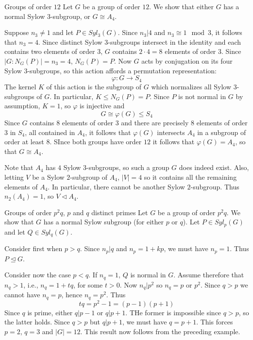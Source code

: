 \documentclass[12pt, a4paper, twoside, openright, titlepage]{book}
\begin{document}
\begin{eg}{Groups of order $12$}{}
    Let $G$ be a group of order $12$. We show that either $G$ has a normal Sylow $3$-subgroup, or $G \cong A_4$.

    Suppose $n_3 \neq 1$ and let $P \in Syl_3(G)$. Since $n_3\vert 4$ and $n_3 \cong 1 \mod 3$, it follows that $n_3 = 4$. Since distinct Sylow $3$-subgroups intersect in the identity and each contains two elements of order $3$, $G$ contains $2\cdot 4 = 8$ elements of order $3$. Since $|G:N_G(P)| = n_3 = 4$, $N_G(P) = P$. Now $G$ acts by conjugation on its four Sylow $3$-subgroups, so this action affords a permutation representation: \begin{equation*}
        \varphi:G\rightarrow S_4
    \end{equation*}
    The kernel $K$ of this action is the subgroup of $G$ which normalizes all Sylow $3$-subgroups of $G$. In particular, $K \leq N_G(P) = P$. Since $P$ is not normal in $G$ by assumption, $K = 1$, so $\varphi$ is injective and \begin{equation*}
        G \cong \varphi(G) \leq S_4
    \end{equation*}
    Since $G$ contains $8$ elements of order $3$ and there are precisely $8$ elements of order $3$ in $S_4$, all contained in $A_4$, it follows that $\varphi(G)$ intersects $A_4$ in a subgroup of order at least $8$. SInce both groups have order $12$ it follows that $\varphi(G) = A_4$, so that $G\cong A_4$.

    Note that $A_4$ has $4$ Sylow $3$-subgroups, so such a group $G$ does indeed exist. Also, letting $V$ be a Sylow $2$-subgroup of $A_4$, $|V| =4$ so it contains all the remaining elements of $A_4$. In particular, there cannot be another Sylow $2$-subgroup. Thus $n_2(A_4) = 1$, so $V\triangleleft A_4$.
\end{eg}

\begin{eg}{Groups of order $p^2q$, $p$ and $q$ distinct primes}{}
    Let $G$ be a group of order $p^2q$. We show that $G$ has a normal Sylow subgroup (for either $p$ or $q$). Let $P \in Syl_p(G)$ and let $Q \in Syl_q(G)$. 

    Consider first when $p > q$. Since $n_p\vert q$ and $n_p = 1+kp$, we must have $n_p = 1$. Thus $P \trianglelefteq G$.

    Consider now the case $p < q$. If $n_q = 1$, $Q$ is normal in $G$. Assume therefore that $n_q > 1$, i.e., $n_q = 1+tq$, for some $t > 0$. Now $n_q\vert p^2$ so $n_q = p$ or $p^2$. Since $q > p$ we cannot have $n_q = p$, hence $n_q = p^2$. Thus \begin{equation*}
        tq = p^2-1 = (p-1)(p+1)
    \end{equation*}
    Since $q$ is prime, either $q\vert p - 1$ or $q \vert p +1$. THe former is impossible since $q > p$, so the latter holds. Since $q > p$ but $q\vert p+1$, we must  have $q = p+1$. This forces $p = 2$, $q = 3$ and $|G| = 12$. This result now follows from the preceding example.
\end{eg}
\end{document}
